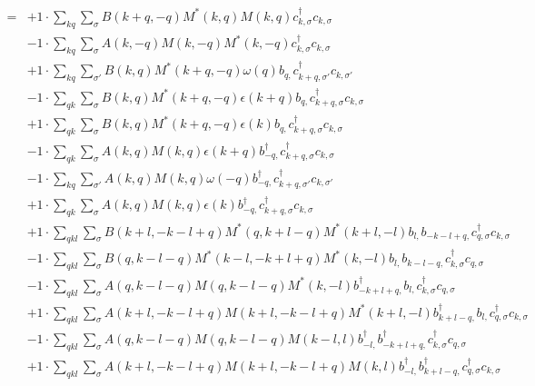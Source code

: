 \begin{align*}
	[\eta, H] = 	&+1 \cdot \sum_{ k q } \sum_{ \sigma } B( k+q, -q )  M^*( k, q )  M( k, q )   c_{ k, \sigma }^\dagger  c_{ k, \sigma }  \\
	&-1 \cdot \sum_{ k q } \sum_{ \sigma } A( k, -q )  M( k, -q )  M^*( k, -q )   c_{ k, \sigma }^\dagger  c_{ k, \sigma }  \\
	&+1 \cdot \sum_{ k q } \sum_{ \sigma' } B( k, q )  M^*( k+q, -q )  \omega( q )   b_{ q, } c_{ k+q, \sigma' }^\dagger  c_{ k, \sigma' }  \\
	&-1 \cdot \sum_{ q k } \sum_{ \sigma } B( k, q )  M^*( k+q, -q )  \epsilon( k+q )   b_{ q, } c_{ k+q, \sigma }^\dagger  c_{ k, \sigma }  \\
	&+1 \cdot \sum_{ q k } \sum_{ \sigma } B( k, q )  M^*( k+q, -q )  \epsilon( k )   b_{ q, } c_{ k+q, \sigma }^\dagger  c_{ k, \sigma }  \\
	&-1 \cdot \sum_{ q k } \sum_{ \sigma } A( k, q )  M( k, q )  \epsilon( k+q )   b_{ -q, }^\dagger  c_{ k+q, \sigma }^\dagger  c_{ k, \sigma }  \\
	&-1 \cdot \sum_{ k q } \sum_{ \sigma' } A( k, q )  M( k, q )  \omega( -q )   b_{ -q, }^\dagger  c_{ k+q, \sigma' }^\dagger  c_{ k, \sigma' }  \\
	&+1 \cdot \sum_{ q k } \sum_{ \sigma } A( k, q )  M( k, q )  \epsilon( k )   b_{ -q, }^\dagger  c_{ k+q, \sigma }^\dagger  c_{ k, \sigma }  \\
	&+1 \cdot \sum_{ q k l } \sum_{ \sigma } B( k+l, -k-l+q )  M^*( q, k+l-q )  M^*( k+l, -l )   b_{ l, } b_{ -k-l+q, } c_{ q, \sigma }^\dagger  c_{ k, \sigma }  \\
	&-1 \cdot \sum_{ q k l } \sum_{ \sigma } B( q, k-l-q )  M^*( k-l, -k+l+q )  M^*( k, -l )   b_{ l, } b_{ k-l-q, } c_{ k, \sigma }^\dagger  c_{ q, \sigma }  \\
	&-1 \cdot \sum_{ q k l } \sum_{ \sigma } A( q, k-l-q )  M( q, k-l-q )  M^*( k, -l )   b_{ -k+l+q, }^\dagger  b_{ l, } c_{ k, \sigma }^\dagger  c_{ q, \sigma }  \\
	&+1 \cdot \sum_{ q k l } \sum_{ \sigma } A( k+l, -k-l+q )  M( k+l, -k-l+q )  M^*( k+l, -l )   b_{ k+l-q, }^\dagger  b_{ l, } c_{ q, \sigma }^\dagger  c_{ k, \sigma }  \\
	&-1 \cdot \sum_{ q k l } \sum_{ \sigma } A( q, k-l-q )  M( q, k-l-q )  M( k-l, l )   b_{ -l, }^\dagger  b_{ -k+l+q, }^\dagger  c_{ k, \sigma }^\dagger  c_{ q, \sigma }  \\
	&+1 \cdot \sum_{ q k l } \sum_{ \sigma } A( k+l, -k-l+q )  M( k+l, -k-l+q )  M( k, l )   b_{ -l, }^\dagger  b_{ k+l-q, }^\dagger  c_{ q, \sigma }^\dagger  c_{ k, \sigma }  \\

\end{align*}
